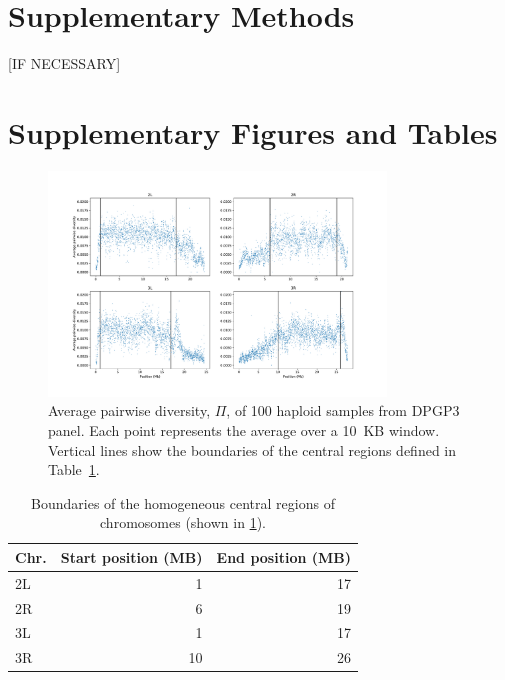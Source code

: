 \documentclass[11pt, letterpaper]{article}   	%
\begin{document}
\printbibliography

\section*{Supplementary Methods}
[IF NECESSARY]

\clearpage

\section*{Supplementary Figures and Tables}

\begin{figure}[h!]
\centering
\includegraphics[width=0.8\textwidth]{figures/pi_vs_position.pdf}
\caption{Average pairwise diversity, $\Pi$, of 100 haploid samples from DPGP3 panel. Each point represents the average over a 10~KB window. Vertical lines show the boundaries of the central regions defined in Table~\ref{tab:central_regions}.
\label{fig:dpgp_pi}}
\end{figure}

\begin{table}[h!]
  \begin{center}
    \caption{Boundaries of the homogeneous central regions of chromosomes (shown in \ref{fig:dpgp_pi}).}
    \label{tab:central_regions}
    \begin{tabular}{l|r|r} %
      \textbf{Chr.} & \textbf{Start position (MB)} & \textbf{End position (MB)}\\
      \hline
      2L & 1 & 17\\
      2R & 6 & 19\\
      3L & 1 & 17\\
      3R & 10 & 26
    \end{tabular}
  \end{center}
\end{table}
\end{document}
